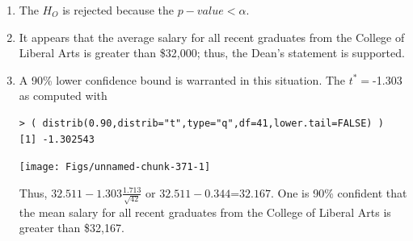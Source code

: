 \documentclass[10pt,openany]{book}\usepackage[]{graphicx}\usepackage[]{color}
\makeatletter
\newenvironment{kframe}{%
 \def\at@end@of@kframe{}%
 \ifinner\ifhmode%
  \def\at@end@of@kframe{\end{minipage}}%
  \begin{minipage}{\columnwidth}%
 \fi\fi%
 \def\FrameCommand##1{\hskip\@totalleftmargin \hskip-\fboxsep
 \colorbox{shadecolor}{##1}\hskip-\fboxsep
     \hskip-\linewidth \hskip-\@totalleftmargin \hskip\columnwidth}%
 \MakeFramed {\advance\hsize-\width
   \@totalleftmargin\z@ \linewidth\hsize
   \@setminipage}}%
 {\par\unskip\endMakeFramed%
 \at@end@of@kframe}
\newenvironment{knitrout}{}{} %
\makeatother
\begin{document}
\begin{itemize}
\begin{enumerate}
\begin{knitrout}
\end{knitrout}
      \item The $H_{O}$ is rejected because the $p-value<\alpha$.
      \item It appears that the average salary for all recent graduates from the College of Liberal Arts is greater than \$32,000; thus, the Dean's statement is supported.
      \item A 90\% lower confidence bound is warranted in this situation.  The $t^{*}=$-1.303 as computed with
\begin{knitrout}
\color{fgcolor}\begin{kframe}
\begin{verbatim}
> ( distrib(0.90,distrib="t",type="q",df=41,lower.tail=FALSE) )
[1] -1.302543
\end{verbatim}
\end{kframe}

{\centering \texttt{[image: Figs/unnamed-chunk-371-1]} 

}



\end{knitrout}
Thus, $32.511-1.303\frac{1.713}{\sqrt{42}}$ or $32.511-0.344$=$32.167$.  One is 90\% confident that the mean salary for all recent graduates from the College of Liberal Arts is greater than \$32,167.
    \end{enumerate}


\end{itemize}
\end{document}
